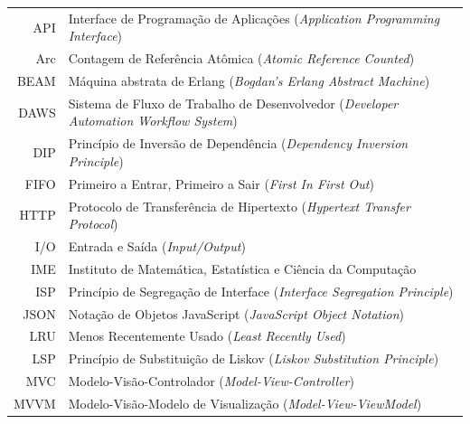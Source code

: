 \documentclass[a4paper,12pt,twoside,english,brazilian]{book}
\begin{document}
\bgroup
\raggedbottom



\begin{tabular}{rl}
   API & Interface de Programação de Aplicações (\emph{Application Programming Interface})\\
   Arc & Contagem de Referência Atômica (\emph{Atomic Reference Counted})\\
  BEAM & Máquina abstrata de Erlang (\emph{Bogdan's Erlang Abstract Machine})\\
   DAWS & Sistema de Fluxo de Trabalho de Desenvolvedor (\emph{Developer Automation Workflow System})\\
   DIP & Princípio de Inversão de Dependência (\emph{Dependency Inversion Principle})\\
   FIFO & Primeiro a Entrar, Primeiro a Sair (\emph{First In First Out})\\
  HTTP & Protocolo de Transferência de Hipertexto (\emph{Hypertext Transfer Protocol})\\
   I/O & Entrada e Saída (\emph{Input/Output})\\
   IME & Instituto de Matemática, Estatística e Ciência da Computação\\
   ISP & Princípio de Segregação de Interface (\emph{Interface Segregation Principle})\\
  JSON & Notação de Objetos JavaScript (\emph{JavaScript Object Notation})\\
   LRU & Menos Recentemente Usado (\emph{Least Recently Used})\\
   LSP & Princípio de Substituição de Liskov (\emph{Liskov Substitution Principle})\\
   MVC & Modelo-Visão-Controlador (\emph{Model-View-Controller})\\
  MVVM & Modelo-Visão-Modelo de Visualização (\emph{Model-View-ViewModel})\\

\end{tabular}
\end{document}
